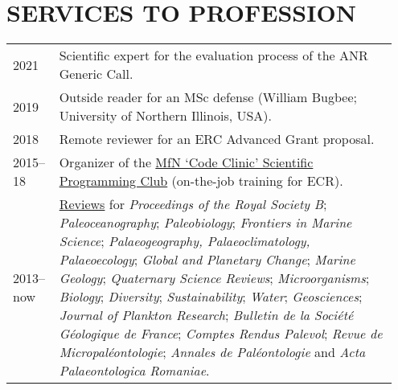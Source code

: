 \documentclass[11pt, a4paper]{article}
\begin{document}
\section{SERVICES TO PROFESSION}
\begin{longtable}{@{}p{0.1\linewidth} P{0.85\linewidth}@{}}
2021 & Scientific expert for the evaluation process of the ANR Generic Call.\\
2019 & Outside reader for an MSc defense (William Bugbee; University of Northern Illinois, USA).\\
2018 & Remote reviewer for an ERC Advanced Grant proposal.\\
2015--18 & Organizer of the \href{https://github.com/plannapus/MfN-Code-Clinic}{MfN `Code Clinic' Scientific Programming Club} (on-the-job training for ECR). \\
2013--now  & \href{http://publons.com/a/1291154/}{Reviews} for \textit{Proceedings of the Royal Society B}; \textit{Paleoceanography}; \textit{Paleobiology}; \textit{Frontiers in Marine Science}; \textit{Palaeo\-geography, Palaeo\-climatology, Palaeo\-ecology}; \textit{Global and Planetary Change}; \textit{Marine Geology}; \textit{Quaternary Science Reviews}; \textit{Microorganisms}; \textit{Biology}; \textit{Diversity}; \textit{Sustainability}; \textit{Water}; \textit{Geosciences}; \textit{Journal of Plankton Research}; \textit{Bulletin de la Soci\'{e}t\'{e} G\'{e}ologique de France}; \textit{Comptes Rendus Palevol}; \textit{Revue de Micropal\'{e}ontologie}; \textit{Annales de Pal\'{e}ontologie} and \textit{Acta Palaeontologica Romaniae}. \\
\end{longtable}
\end{document}
